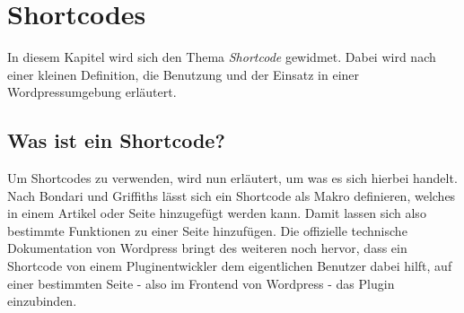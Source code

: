 \section{Shortcodes}\label{shortcodes}
In diesem Kapitel wird sich den Thema \emph{Shortcode} gewidmet. Dabei wird nach einer kleinen Definition, die Benutzung und der Einsatz in einer Wordpressumgebung erläutert. 
\subsection{Was ist ein Shortcode?}
Um Shortcodes zu verwenden, wird nun erläutert, um was es sich hierbei handelt. Nach Bondari und Griffiths
 lässt sich ein Shortcode als Makro definieren, welches in einem Artikel oder Seite hinzugefügt werden kann. Damit lassen sich also bestimmte Funktionen zu einer Seite hinzufügen. \newline
Die offizielle technische Dokumentation von Wordpress bringt des weiteren noch hervor, dass ein Shortcode von einem Pluginentwickler dem eigentlichen Benutzer dabei hilft, auf einer bestimmten Seite - also im Frontend von Wordpress - das Plugin einzubinden.
